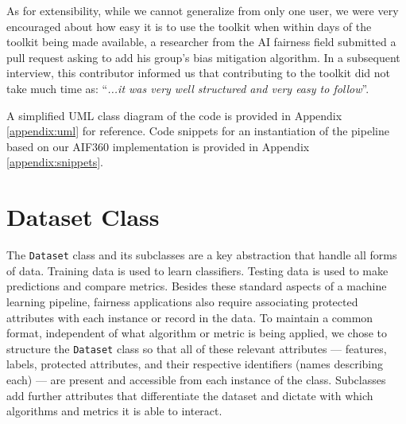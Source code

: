 \documentclass{article}
\begin{document}
As for extensibility, while we cannot generalize from only one user, we were very encouraged about how easy it is to use the toolkit when within days of the toolkit being made available, a researcher from the AI fairness field submitted a pull request asking to add his group's bias mitigation algorithm. In a subsequent interview, this contributor informed us that contributing to the toolkit did not take much time as: ``\textit{...it was very well structured and very easy to follow}''.  

A simplified UML class diagram of the code is provided in Appendix \ref{appendix:uml} for reference. Code snippets for an instantiation of the pipeline based on our AIF360 implementation is provided in Appendix \ref{appendix:snippets}.



\section{Dataset Class}
\label{sec:datasetclass}

The \texttt{Dataset} class and its subclasses are a key abstraction that handle all forms of data. Training data is used to learn classifiers.  Testing data is used to make predictions and compare metrics. Besides these standard aspects of a machine learning pipeline, fairness applications also require associating protected attributes with each instance or record in the data. To maintain a common format, independent of what algorithm or metric is being applied, we chose to structure the \texttt{Dataset} class so that all of these relevant attributes --- features, labels, protected attributes, and their respective identifiers (names describing each) --- are present and accessible from each instance of the class. Subclasses add further attributes that differentiate the dataset and dictate with which algorithms and metrics it is able to interact.
\end{document}
